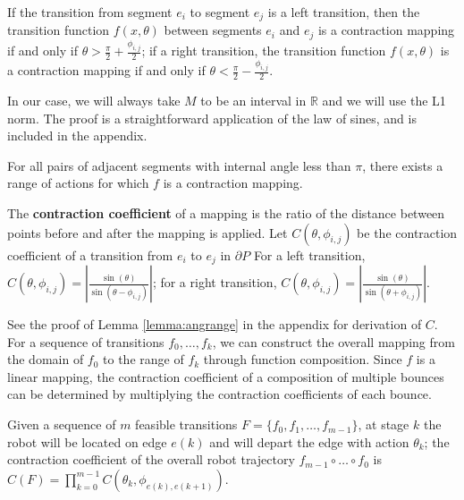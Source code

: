 \documentclass[]{styles/svproc}  %
\begin{document}
\begin{lemma} \label{lemma:angrange}
If the transition from segment $e_i$ to segment $e_j$ is a left transition, then the
transition function $f(x, \theta)$ between segments $e_i$ and $e_j$ is a contraction
mapping if and only if $\theta > \frac{\pi}{2}+\frac{\phi_{i, j}}{2}$;
if a right transition, the transition function $f(x, \theta)$ is a contraction mapping if
and only if $\theta < \frac{\pi}{2}-\frac{\phi_{i, j}}{2}$.
\end{lemma}

In our case, we will always take $M$ to be an interval in $\mathbb{R}$ and we
will use the L1 norm. The proof is a straightforward application of the law of sines, and is included
in the appendix.

\begin{corollary} \label{coro:existcontract}
For all pairs of adjacent 
segments with internal angle less than $\pi$,
there exists a range of actions for which $f$ is a contraction mapping.
\end{corollary}

\begin{definition}
The \textbf{contraction coefficient} of a mapping is the ratio of the distance between points before and after
the mapping is applied.
Let $C(\theta, \phi_{i, j})$ be the contraction coefficient of a transition from $e_i$ to $e_j$ in $\partial P$
For a left transition, $C(\theta, \phi_{i, j}) = | \frac{\sin(\theta)}{\sin(\theta - \phi_{i, j})} |$; 
for a right transition,  $C(\theta, \phi_{i, j}) = | \frac{\sin(\theta)}{\sin(\theta + \phi_{i, j})} |$.
\end{definition}

See the proof of Lemma \ref{lemma:angrange} in the appendix for derivation of
$C$. For a sequence of transitions $f_0, \ldots, f_k$, we can construct the overall
mapping from the domain of $f_0$ to the range of $f_k$ through function
composition. Since $f$ is a linear mapping, the contraction coefficient of a composition 
of multiple bounces can be determined by multiplying the contraction
coefficients of each bounce.

\begin{definition} \label{def:c}
Given a sequence of $m$ feasible transitions $F = \{f_0, f_1, \ldots, f_{m-1}\}$, at stage $k$ the robot 
will be located on edge $e(k)$ and will depart the edge with
action $\theta_k$; the contraction coefficient of the overall robot
trajectory $f_{m-1} \circ \ldots \circ f_0$ is $C(F) = \prod_{k=0}^{m-1} C(\theta_{k}, \phi_{e(k), e(k+1)})$.
\end{definition}
\end{document}
